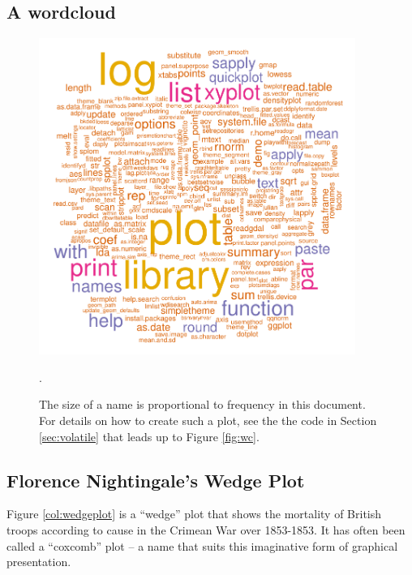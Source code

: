 \subsection*{A wordcloud}
\begin{figure}
\vspace*{-0.75cm}
\includegraphics[width=0.92\textwidth]{colorArt/cloudfunR}
\caption{The size of a
  name is proportional to frequency in this document.  For details
  on how to create such a plot, see the the code in Section
  \ref{sec:volatile} that leads up to Figure \ref{fig:wc}.
  \label{fig:cloudfun}}.
\end{figure}

\newpage
\subsection*{Florence Nightingale's Wedge Plot}\label{sec:wedge}


Figure \ref{col:wedgeplot} is a ``wedge'' plot that shows the
mortality of British troops according to cause in the Crimean War over
1853-1853. It has often been called a ``coxcomb'' plot -- a name that
suits this imaginative form of graphical presentation.


